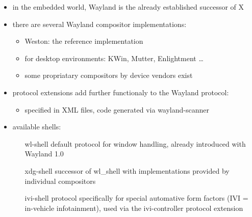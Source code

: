 \documentclass[ucs,9pt]{beamer}
\begin{document}
\begin{frame}
    \begin{itemize}
        \item in the embedded world, Wayland is the already established successor of X
        \item there are several Wayland compositor implementations:
            \begin{itemize}
                \item Weston: the reference implementation
                \item for desktop environments: KWin, Mutter, Enlightment \dots
                \item some propriatary compositors by device vendors exist
            \end{itemize}
        \item protocol extensions add further functionaly to the Wayland protocol:
            \begin{itemize}
                \item specified in XML files, code generated via wayland-scanner
            \end{itemize}
        \item available shells:
            \begin{itemize}
                \item [wl-shell] default protocol for window handling, already introduced with Wayland 1.0
                \item [xdg-shell] successor of wl\_shell with implementations provided by individual compositors
                \item [ivi-shell] protocol specifically for special automative form factors  (IVI = in-vehicle infotainment), used via the ivi-controller protocol extension
            \end{itemize}
    \end{itemize}
\end{frame}
\end{document}
